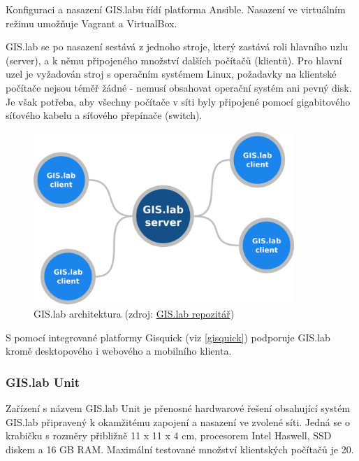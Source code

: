 Konfiguraci a nasazení GIS.labu řídí platforma Ansible. Nasazení ve
virtuálním režimu umožňuje Vagrant a VirtualBox.

GIS.lab se po nasazení sestává z jednoho stroje, který zastává roli
hlavního uzlu (server), a k němu připojeného množství dalších počítačů
(klientů). Pro hlavní uzel je vyžadován stroj s operačním systémem
Linux, požadavky na klientské počítače nejsou téměř žádné - nemusí
obsahovat operační systém ani pevný disk. Je však potřeba, aby všechny
počítače v síti byly připojené pomocí gigabitového síťového kabelu a
síťového přepínače (switch).

\begin{figure}[H] \centering
    \includegraphics[width=280pt]{./pictures/gislab-architecture.png}
    \caption[GIS.lab architektura]{GIS.lab architektura (zdroj:
	\href{https://github.com/gislab-npo/gislab-doc/blob/master/img/general/gislab-architecture.png}{GIS.lab repozitář})}
	\label{fig:gislab-architecture}
\end{figure}

S pomocí integrované platformy Gisquick (viz \ref{gisquick}) podporuje
GIS.lab kromě desktopového i webového a mobilního klienta.

\subsubsection{GIS.lab Unit}
\label{gislab-unit}
Zařízení s názvem GIS.lab Unit je přenosné hardwarové řešení
obsahující systém GIS.lab připravený k okamžitému zapojení a nasazení
ve zvolené síti. Jedná se o krabičku s rozměry přibližně 11 x 11 x 4
cm, procesorem Intel Haswell, SSD diskem a 16 GB RAM. Maximální
testované množství klientských počítačů je 20.

